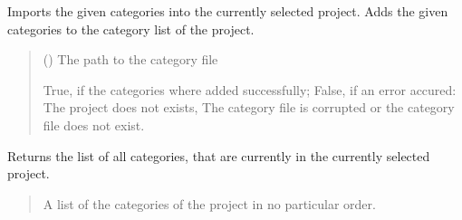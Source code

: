 \documentclass[letterpaper,10pt,english]{sphinxmanual}
\begin{document}
\begin{fulllineitems}
\begin{fulllineitems}
\begin{quote}
\begin{description}
\sphinxAtStartPar
{}

\end{description}\end{quote}

\end{fulllineitems}


\begin{fulllineitems}
\label{\detokenize{apidoc/src.osm_configurator.control:src.osm_configurator.control.control_interface.IControl.import_category_configuration}}
\pysigstartsignatures
{}
\pysigstopsignatures
\sphinxAtStartPar
Imports the given categories into the currently selected project.
Adds the given categories to the category list of the project.
\begin{quote}\begin{description}
\sphinxAtStartPar
{} () \textendash{} The path to the category file

\sphinxAtStartPar
True, if the categories where added successfully; False, if an error accured: The project does not exists, The category file is corrupted or the category file does not exist.

\sphinxAtStartPar
{}

\end{description}\end{quote}

\end{fulllineitems}


\begin{fulllineitems}
\label{\detokenize{apidoc/src.osm_configurator.control:src.osm_configurator.control.control_interface.IControl.get_list_of_categories}}
\pysigstartsignatures
{}
\pysigstopsignatures
\sphinxAtStartPar
Returns the list of all categories, that are currently in the currently selected project.
\begin{quote}\begin{description}
\sphinxAtStartPar
A list of the categories of the project in no particular order.


\end{description}
\end{quote}
\end{fulllineitems}
\end{fulllineitems}
\end{document}
